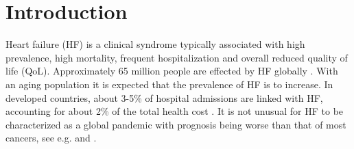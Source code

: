\documentclass[../thesis.tex]{subfiles}
\begin{document}
\chapter{Introduction}
\label{chap:intro}

\noindent  Heart failure (HF) is a clinical syndrome typically associated with high prevalence, high mortality, frequent hospitalization and overall reduced quality of life (QoL). Approximately 65 million people are effected by HF globally \citep{hay2017global}. With an aging population it is expected that the prevalence of HF is to increase. In developed countries, about 3-5\% of hospital admissions are linked with HF, accounting for about 2\% of the total health cost \citep{tripoliti2017heart}. It is not unusual for HF to be characterized as a global pandemic with prognosis being worse than that of most cancers, see e.g. \cite{braunwald2015war} and \cite{savarese2017global}.\\
\end{document}
